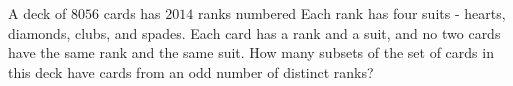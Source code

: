 A deck of $8056$ cards has $2014$ ranks numbered  Each rank has four suits - hearts, diamonds, clubs, and spades. Each card has a rank and a suit, and no two cards have the same rank and the same suit. How many subsets of the set of cards in this deck have cards from an odd number of distinct ranks?